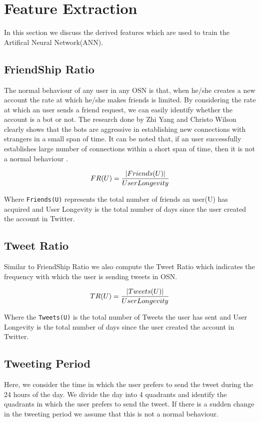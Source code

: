 \documentclass[conference]{IEEEtran}
\begin{document}
\section{Feature Extraction}
\label{featureDescription}
In this section we discuss the derived features which are used to train the Artifical Neural Network(ANN).

\subsection{FriendShip Ratio}
The normal behaviour of any user in any OSN is that, when he/she creates a new account the rate at which he/she makes friends is limited. By considering the rate at which an user sends a friend request, we can easily identify whether the account is a bot or not. The research done by Zhi Yang and Christo Wilson clearly shows that the bots are aggressive in establishing new connections with strangers in a small span of time. It can be noted that, if an user successfully establishes large number of connections within a short span of time, then it is not a normal behaviour \cite{11}.

\begin{equation}
	 FR (U) = \frac{|Friends(U)|}{User Longevity} \\
\end{equation}

Where \verb |Friends(U)| represents the total number of friends an user(U) has acquired and User Longevity is the total number of days since the user created the account in Twitter. 

\subsection{Tweet Ratio}
Similar to FriendShip Ratio we also compute the Tweet Ratio which indicates the frequency with which the user is sending tweets in OSN.
	
\begin{equation}
	 TR (U) = \frac{|Tweets(U)|}{User Longevity} \\
\end{equation}	

Where the \verb |Tweets(U)| is the total number of Tweets the user has sent and User Longevity is the total number of days since the user created the account in Twitter.

\subsection{Tweeting Period}
Here, we consider the time in which the user prefers to send the tweet during the 24 hours of the day. We divide the day into 4 quadrants and identify the quadrants in which the user prefers to send the tweet. If there is a sudden change in the tweeting period we assume that this is not a normal behaviour. \\
\end{document}
